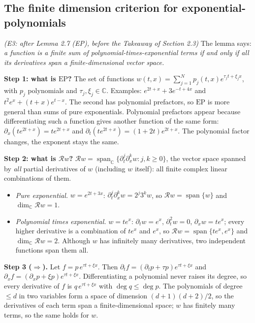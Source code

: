 \documentclass[11pt]{article}
\theoremstyle{plain}
\theoremstyle{definition}
\theoremstyle{remark}
\newcommand{\C}{\mathbb{C}}
\newcommand{\ring}{\mathcal{R}}            %
\DeclareMathOperator{\spn}{span}
\newcommand{\EP}{\mathrm{EP}}               %
\begin{document}
\subsection{The finite dimension criterion for exponential-polynomials}\label{expl:E3}
\noindent\emph{(E3: after Lemma 2.7 (EP), before the Takeaway of Section 2.3)}
The lemma says: \emph{a function is a finite sum of polynomial-times-exponential terms if and only if all its derivatives span a finite-dimensional vector space.}

\medskip\textbf{Step 1: what is $\EP$?} The set of functions $w(t,x)=\sum_{j=1}^Np_j(t,x)e^{\tau_jt+\xi_jx}$, with $p_j$ polynomials and $\tau_j,\xi_j\in\C$. Examples: $e^{2t+x}+3e^{-t+4x}$ and $t^2e^x+(t+x)e^{t-x}$. The second has polynomial prefactors, so $\EP$ is more general than sums of pure exponentials. Polynomial prefactors appear because differentiating such a function gives another function of the same form: $\partial_x(te^{2t+x})=te^{2t+x}$ and $\partial_t(te^{2t+x})=(1+2t)e^{2t+x}$. The polynomial factor changes, the exponent stays the same.

\medskip\textbf{Step 2: what is $\ring w$?} $\ring w=\spn_\C\{\partial_t^j\partial_x^kw:j,k\ge0\}$, the vector space spanned by \emph{all} partial derivatives of $w$ (including $w$ itself): all finite complex linear combinations of them.
\begin{itemize}[nosep]
\item \emph{Pure exponential.} $w=e^{2t+3x}$: $\partial_t^j\partial_x^kw=2^j3^kw$, so $\ring w=\spn\{w\}$ and $\dim_\C\ring w=1$.
\item \emph{Polynomial times exponential.} $w=te^x$: $\partial_tw=e^x$, $\partial_t^2w=0$, $\partial_xw=te^x$; every higher derivative is a combination of $te^x$ and $e^x$, so $\ring w=\spn\{te^x,e^x\}$ and $\dim_\C\ring w=2$. Although $w$ has infinitely many derivatives, two independent functions span them all.
\end{itemize}

\medskip\textbf{Step 3 ($\Rightarrow$).} Let $f=p\,e^{\tau t+\xi x}$. Then $\partial_tf=(\partial_tp+\tau p)e^{\tau t+\xi x}$ and $\partial_xf=(\partial_xp+\xi p)e^{\tau t+\xi x}$. Differentiating a polynomial never raises its degree, so every derivative of $f$ is $q\,e^{\tau t+\xi x}$ with $\deg q\le\deg p$. The polynomials of degree $\le d$ in two variables form a space of dimension $(d+1)(d+2)/2$, so the derivatives of each term span a finite-dimensional space; $w$ has finitely many terms, so the same holds for $w$.
\end{document}
